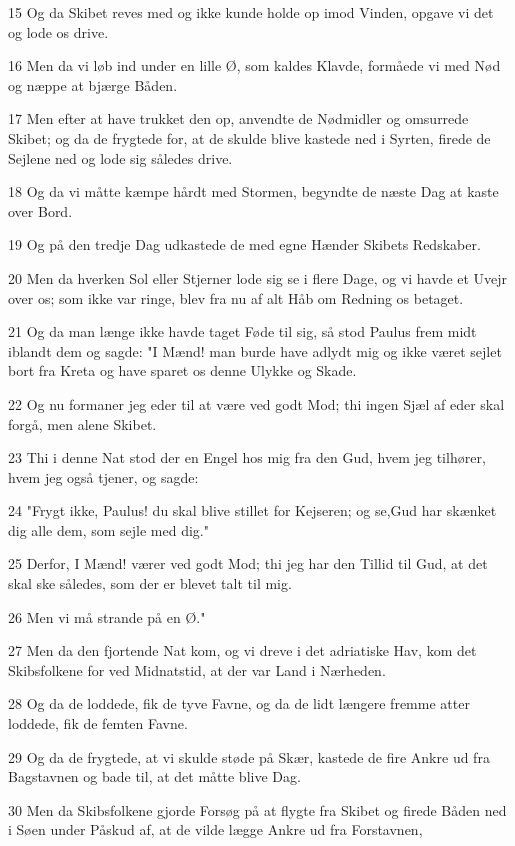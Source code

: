 \par 15 Og da Skibet reves med og ikke kunde holde op imod Vinden, opgave vi det og lode os drive.
\par 16 Men da vi løb ind under en lille Ø, som kaldes Klavde, formåede vi med Nød og næppe at bjærge Båden.
\par 17 Men efter at have trukket den op, anvendte de Nødmidler og omsurrede Skibet; og da de frygtede for, at de skulde blive kastede ned i Syrten, firede de Sejlene ned og lode sig således drive.
\par 18 Og da vi måtte kæmpe hårdt med Stormen, begyndte de næste Dag at kaste over Bord.
\par 19 Og på den tredje Dag udkastede de med egne Hænder Skibets Redskaber.
\par 20 Men da hverken Sol eller Stjerner lode sig se i flere Dage, og vi havde et Uvejr over os; som ikke var ringe, blev fra nu af alt Håb om Redning os betaget.
\par 21 Og da man længe ikke havde taget Føde til sig, så stod Paulus frem midt iblandt dem og sagde: "I Mænd! man burde have adlydt mig og ikke været sejlet bort fra Kreta og have sparet os denne Ulykke og Skade.
\par 22 Og nu formaner jeg eder til at være ved godt Mod; thi ingen Sjæl af eder skal forgå, men alene Skibet.
\par 23 Thi i denne Nat stod der en Engel hos mig fra den Gud, hvem jeg tilhører, hvem jeg også tjener, og sagde:
\par 24 "Frygt ikke, Paulus! du skal blive stillet for Kejseren; og se,Gud har skænket dig alle dem, som sejle med dig."
\par 25 Derfor, I Mænd! værer ved godt Mod; thi jeg har den Tillid til Gud, at det skal ske således, som der er blevet talt til mig.
\par 26 Men vi må strande på en Ø."
\par 27 Men da den fjortende Nat kom, og vi dreve i det adriatiske Hav, kom det Skibsfolkene for ved Midnatstid, at der var Land i Nærheden.
\par 28 Og da de loddede, fik de tyve Favne, og da de lidt længere fremme atter loddede, fik de femten Favne.
\par 29 Og da de frygtede, at vi skulde støde på Skær, kastede de fire Ankre ud fra Bagstavnen og bade til, at det måtte blive Dag.
\par 30 Men da Skibsfolkene gjorde Forsøg på at flygte fra Skibet og firede Båden ned i Søen under Påskud af, at de vilde lægge Ankre ud fra Forstavnen,
